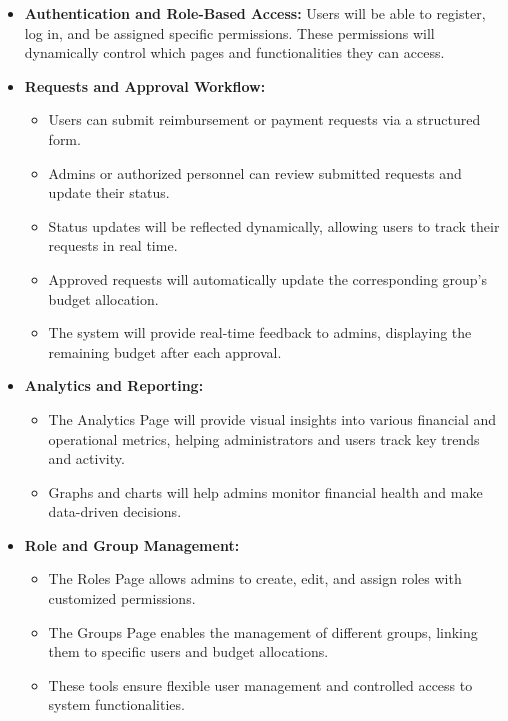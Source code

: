\documentclass{article}
\begin{document}
\begin{itemize}
    \item \textbf{Authentication and Role-Based Access:} Users will be able to register, log in, and be assigned specific permissions. These permissions will dynamically control which pages and functionalities they can access.

    \item \textbf{Requests and Approval Workflow:}
    \begin{itemize}
        \item Users can submit reimbursement or payment requests via a structured form.
        \item Admins or authorized personnel can review submitted requests and update their status.
        \item Status updates will be reflected dynamically, allowing users to track their requests in real time.
        \item Approved requests will automatically update the corresponding group's budget allocation.
        \item The system will provide real-time feedback to admins, displaying the remaining budget after each approval.
    \end{itemize}

    \item \textbf{Analytics and Reporting:}
    \begin{itemize}
        \item The Analytics Page will provide visual insights into various financial and operational metrics, helping administrators and users track key trends and activity.
        \item Graphs and charts will help admins monitor financial health and make data-driven decisions.
    \end{itemize}

    \item \textbf{Role and Group Management:}
    \begin{itemize}
        \item The Roles Page allows admins to create, edit, and assign roles with customized permissions.
        \item The Groups Page enables the management of different groups, linking them to specific users and budget allocations.
        \item These tools ensure flexible user management and controlled access to system functionalities.
    \end{itemize}


\end{itemize}
\end{document}
